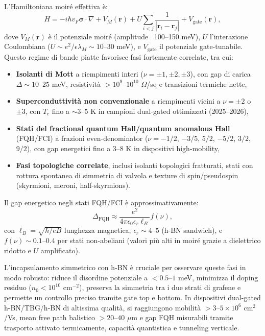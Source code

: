 \documentclass[11pt,a4paper]{article}
\theoremstyle{plain}
\theoremstyle{definition}
\begin{document}
L'Hamiltoniana moiré effettiva è:
\begin{equation}
H = -i \hbar v_F \boldsymbol{\sigma} \cdot \nabla + V_M(\mathbf{r}) + U \sum_{i<j} \frac{1}{|\mathbf{r}_i - \mathbf{r}_j|} + V_{\text{gate}}(\mathbf{r}),
\end{equation}
dove $V_M(\mathbf{r})$ è il potenziale moiré (amplitude ~100–150 meV), $U$ l'interazione Coulombiana ($U \sim e^2 / \epsilon \lambda_M \sim 10$--$30$ meV), e $V_{\text{gate}}$ il potenziale gate-tunabile. Questo regime di bande piatte favorisce fasi fortemente correlate, tra cui:

\begin{itemize}
    \item \textbf{Isolanti di Mott} a riempimenti interi ($\nu = \pm 1, \pm 2, \pm 3$), con gap di carica $\Delta \sim 10$--$25$ meV, resistività $>10^9$–$10^{10}$ $\Omega$/sq e transizioni termiche nette,
    \item \textbf{Superconduttività non convenzionale} a riempimenti vicini a $\nu = \pm 2$ o $\pm 3$, con $T_c$ fino a $\sim 3$--$5$ K in campioni dual-gated ottimizzati (2025–2026),
    \item \textbf{Stati del fractional quantum Hall/quantum anomalous Hall} (FQH/FCI) a frazioni even-denominator ($\nu = -1/2$, $-3/5$, $5/2$, $-5/2$, $3/2$, $9/2$), con gap energetici fino a $3$--$8$ K in dispositivi high-mobility,
    \item \textbf{Fasi topologiche correlate}, inclusi isolanti topologici fratturati, stati con rottura spontanea di simmetria di valvola e texture di spin/pseudospin (skyrmioni, meroni, half-skyrmions).
\end{itemize}

Il gap energetico negli stati FQH/FCI è approssimativamente:
\begin{equation}
\Delta_{\text{FQH}} \approx \frac{e^2}{4\pi \epsilon_0 \epsilon_r \ell_B} f(\nu),
\end{equation}
con $\ell_B = \sqrt{\hbar / eB}$ lunghezza magnetica, $\epsilon_r \sim 4$--$5$ (h-BN sandwich), e $f(\nu) \sim 0.1$--$0.4$ per stati non-abeliani (valori più alti in moiré grazie a dielettrico ridotto e $U$ amplificato).

L'incapsulamento simmetrico con h-BN è cruciale per osservare queste fasi in modo robusto: riduce il disordine potenziale a $<0.5$--$1$ meV, minimizza il doping residuo ($n_0 < 10^{10}$ cm$^{-2}$), preserva la simmetria tra i due strati di grafene e permette un controllo preciso tramite gate top e bottom. In dispositivi dual-gated h-BN/TBG/h-BN di altissima qualità, si raggiungono mobilità $>3$--$5 \times 10^6$ cm$^2$/Vs, mean free path balistico $>20$–$40$ $\mu$m e gap FQH misurabili tramite trasporto attivato termicamente, capacità quantistica e tunneling verticale.
\end{document}
